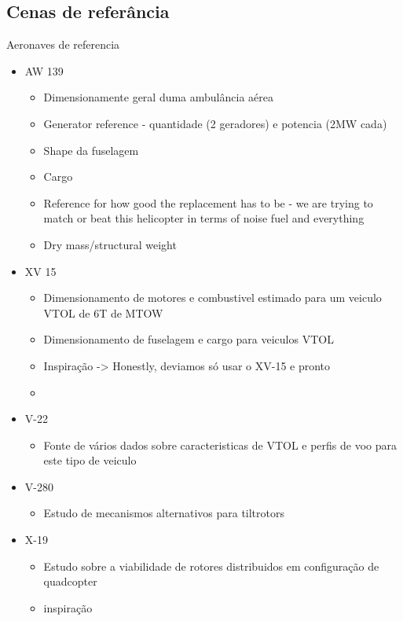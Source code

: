 \subsection{Cenas de referância}
 Aeronaves de referencia
    \begin{itemize}
        \item AW 139
         \begin{itemize}
            \item Dimensionamente geral duma ambulância aérea
            \item Generator reference - quantidade (2 geradores) e potencia (2MW cada)
            \item Shape da fuselagem
            \item Cargo
            \item Reference for how good the replacement has to be - we are trying to match or beat this helicopter in terms of noise fuel and everything
            \item Dry mass/structural weight
        \end{itemize}
        
        \item XV 15
            \begin{itemize}
            \item Dimensionamento de motores e combustivel estimado para um veiculo VTOL de 6T de MTOW
            \item Dimensionamento de fuselagem e cargo para veiculos VTOL
            \item Inspiração -> Honestly, deviamos só usar o XV-15 e pronto
            \item 
        \end{itemize}
        
        \item V-22
        \begin{itemize}
            \item Fonte de vários dados sobre caracteristicas de VTOL e perfis de voo para este tipo de veiculo
        \end{itemize}\textbf{}
        
        \item V-280
        \begin{itemize}
            \item Estudo de mecanismos alternativos para tiltrotors
        \end{itemize}
        
        \item X-19
        \begin{itemize}
            \item Estudo sobre a viabilidade de rotores distribuidos em configuração de quadcopter
            \item inspiração
        \end{itemize}
        

\end{itemize}
